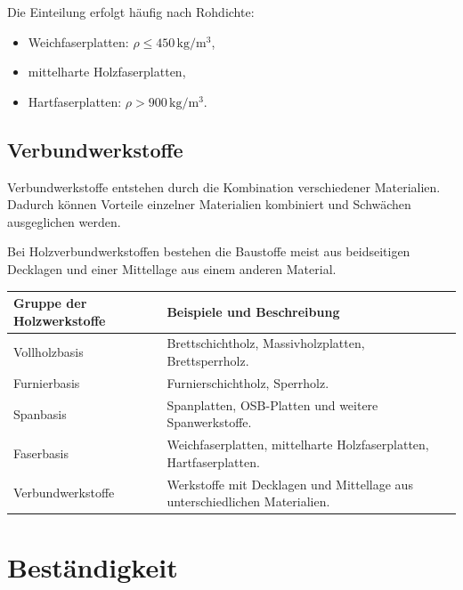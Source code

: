 \documentclass[
  12pt,
  a4paper,
  oneside
]{scrreprt}
\begin{document}
Die Einteilung erfolgt häufig nach Rohdichte:

\begin{itemize}
  \item Weichfaserplatten: $\rho \leq 450\,\mathrm{kg/m^3}$,
  \item mittelharte Holzfaserplatten,
  \item Hartfaserplatten: $\rho > 900\,\mathrm{kg/m^3}$.
\end{itemize}



\subsection{Verbundwerkstoffe}

Verbundwerkstoffe entstehen durch die Kombination verschiedener
Materialien. Dadurch können Vorteile einzelner Materialien kombiniert
und Schwächen ausgeglichen werden. 

Bei Holzverbundwerkstoffen bestehen die Baustoffe meist aus beidseitigen
Decklagen und einer Mittellage aus einem anderen Material.


\begin{longtable}{
  >{\raggedright\arraybackslash}p{}
  >{\raggedright\arraybackslash}p{}
}
\toprule
\textbf{Gruppe der Holzwerkstoffe} &
\textbf{Beispiele und Beschreibung} \\
\midrule
\endhead

Vollholzbasis &
Brettschichtholz, Massivholzplatten, Brettsperrholz. \\

Furnierbasis &
Furnierschichtholz, Sperrholz. \\

Spanbasis &
Spanplatten, OSB-Platten und weitere Spanwerkstoffe. \\

Faserbasis &
Weichfaserplatten, mittelharte Holzfaserplatten, Hartfaserplatten. \\

Verbundwerkstoffe &
Werkstoffe mit Decklagen und Mittellage aus unterschiedlichen
Materialien. \\

\bottomrule
\end{longtable}



\section{Beständigkeit}
\end{document}
